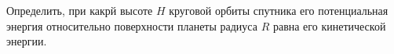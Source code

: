 Определить, при какрй высоте $H$ круговой орбиты спутника его
потенциальная энергия относительно поверхности планеты радиуса $R$ равна
его кинетической энергии.

